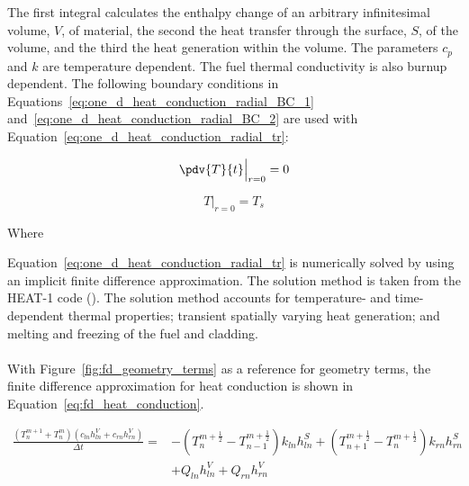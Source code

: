 The first integral calculates the enthalpy change of an arbitrary infinitesimal volume, $V$, of
material, the second the heat transfer through the surface, $S$, of the volume, and the third the
heat generation within the volume. The parameters \(c_{p}\)and \(k\) are temperature dependent. The
fuel thermal conductivity is also burnup dependent. The following boundary conditions in
Equations~\ref{eq:one_d_heat_conduction_radial_BC_1} and~\ref{eq:one_d_heat_conduction_radial_BC_2}
are used with Equation~\ref{eq:one_d_heat_conduction_radial_tr}:

\begin{equation}
    \label{eq:one_d_heat_conduction_radial_BC_1}
    \pdv{T}{t}\Bigr|_{r=0} = 0
\end{equation}

\begin{equation}
    \label{eq:one_d_heat_conduction_radial_BC_2}
    T\Bigr|_{r=0} = T_{s}
\end{equation}

Where

Equation~\ref{eq:one_d_heat_conduction_radial_tr} is numerically solved by using an implicit finite
difference approximation. The solution method is taken from the HEAT-1 code
(\cite{ref:Wagner1963}). The solution method accounts for temperature- and time-dependent
thermal properties; transient spatially varying heat generation; and melting and freezing of the
fuel and cladding.
\\
\\
With Figure~\ref{fig:fd_geometry_terms} as a reference for geometry terms, the finite
difference approximation for heat conduction is shown in Equation~\ref{eq:fd_heat_conduction}.

\begin{equation}
    \label{eq:fd_heat_conduction}
    \begin{aligned}
    \frac{\left(T^{m+1}_{n} + T^{m}_{n}\right) \left(c_{ln}h_{ln}^{V} + c_{rn}h_{rn}^{V} \right)}{\Delta t} = &
    -\left( T_{n}^{m + \frac{1}{2}} - T_{n - 1}^{m + \frac{1}{2}} \right)k_{ln}h_{ln}^{S} + \left( T_{n + 1}^{m + \frac{1}{2}} - T_{n}^{m + \frac{1}{2}} \right)k_{rn}h_{rn}^{S}\\
        &+ Q_{ln}h_{ln}^{V} + Q_{rn}h_{rn}^{V}
    \end{aligned}
\end{equation}

